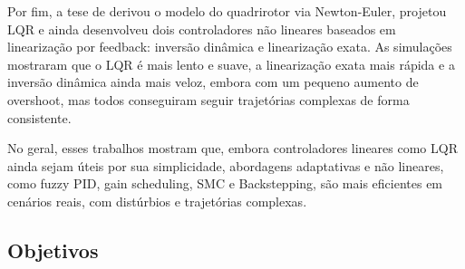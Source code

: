 Por fim, a tese de \cite{thesis} derivou o modelo do quadrirotor via Newton-Euler, projetou LQR e ainda desenvolveu dois controladores não lineares baseados em linearização por feedback: inversão dinâmica e linearização exata. As simulações mostraram que o LQR é mais lento e suave, a linearização exata mais rápida e a inversão dinâmica ainda mais veloz, embora com um pequeno aumento de overshoot, mas todos conseguiram seguir trajetórias complexas de forma consistente.

No geral, esses trabalhos mostram que, embora controladores lineares como LQR ainda sejam úteis por sua simplicidade, abordagens adaptativas e não lineares, como fuzzy PID, gain scheduling, SMC e Backstepping, são mais eficientes em cenários reais, com distúrbios e trajetórias complexas.

\subsection{Objetivos}
\lipsum[1]
